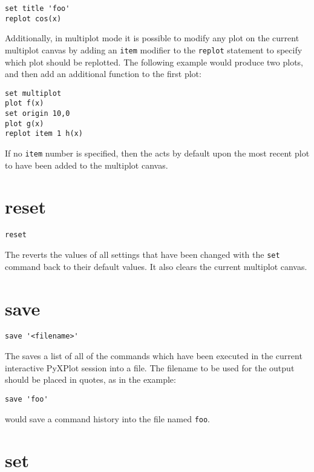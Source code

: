 \begin{verbatim}
set title 'foo'
replot cos(x)
\end{verbatim}

Additionally, in multiplot mode it is possible to modify any plot on the
current multiplot canvas by adding an {\tt item} modifier to the {\tt replot}
statement to specify which plot should be replotted.  The following example
would produce two plots, and then add an additional function to the first plot:

\begin{verbatim}
set multiplot
plot f(x)
set origin 10,0
plot g(x)
replot item 1 h(x)
\end{verbatim}

If no {\tt item} number is specified, then the  acts by default
upon the most recent plot to have been added to the multiplot canvas.


\section{reset}

\begin{verbatim}
reset
\end{verbatim}

The  reverts the values of all settings that have been changed
with the {\tt set} command back to their default values. It also clears the
current multiplot canvas.


\section{save}

\begin{verbatim}
save '<filename>'
\end{verbatim}

The  saves a list of all of the commands which have been executed
in the current interactive PyXPlot session into a file. The filename to be used
for the output should be placed in quotes, as in the example:

\begin{verbatim}
save 'foo'
\end{verbatim}

\noindent would save a command history into the file named {\tt foo}.


\section{set}

